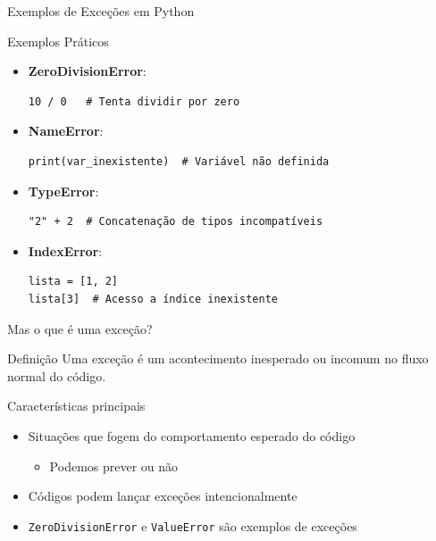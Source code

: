 \begin{frame}[fragile]{Exemplos de Exceções em Python}

    \begin{exampleblock}{Exemplos Práticos}
        \begin{itemize}
            \item \textbf{ZeroDivisionError}:
                  \begin{verbatim}
10 / 0   # Tenta dividir por zero
            \end{verbatim}

            \item \textbf{NameError}:
                  \begin{verbatim}
print(var_inexistente)  # Variável não definida
            \end{verbatim}

            \item \textbf{TypeError}:
                  \begin{verbatim}
"2" + 2  # Concatenação de tipos incompatíveis
            \end{verbatim}

            \item \textbf{IndexError}:
                  \begin{verbatim}
lista = [1, 2]
lista[3]  # Acesso a índice inexistente
            \end{verbatim}
        \end{itemize}
    \end{exampleblock}


\end{frame}


\begin{frame}{Mas o que é uma exceção?}
    \begin{block}{Definição}
        Uma exceção é um acontecimento inesperado ou incomum no fluxo normal do código.
    \end{block}

    \begin{block}{Características principais}
        \begin{itemize}
            \item Situações que fogem do comportamento esperado do código
                  \begin{itemize}
                      \item Podemos prever ou não
                  \end{itemize}
            \item Códigos podem lançar exceções intencionalmente
            \item \texttt{ZeroDivisionError} e \texttt{ValueError} são exemplos de exceções
        \end{itemize}
    \end{block}

\end{frame}

